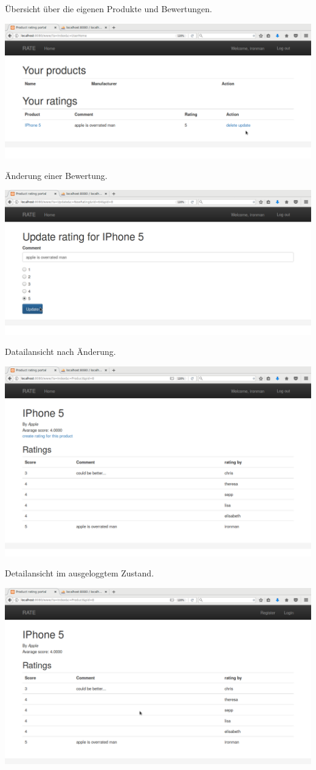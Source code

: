 \documentclass{article}
\begin{document}
Übersicht über die eigenen Produkte und Bewertungen.

\includegraphics[width=1.0\textwidth]{8.png}

Änderung einer Bewertung.

\includegraphics[width=1.0\textwidth]{9.png}

Datailansicht nach Änderung.

\includegraphics[width=1.0\textwidth]{10.png}

Detailansicht im ausgeloggtem Zustand.

\includegraphics[width=1.0\textwidth]{11.png}
\end{document}
